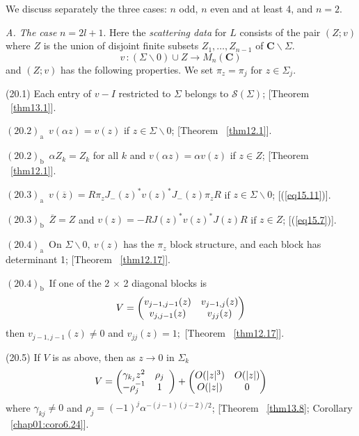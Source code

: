 \documentclass{surv-l}
\theoremstyle{plain}
\theoremstyle{definition}
\numberwithin{equation}{chapter}
\begin{document}
We discuss separately the three cases: $n$ odd, $n$ even and at least 4, and $n=2$.

\emph{A. The case} $n=2l+1$. Here the \emph{scattering data} for $L$ consists of the pair $(Z; v)$ where $Z$ is the union of disjoint finite subsets $Z_{1},\ldots,Z_{n-1}$ of $ \textbf{C}\backslash\Sigma$.
\begin{equation*}
v\,:(\Sigma\backslash 0)\cup Z\rightarrow M_{n}(\mathbf{C})
\end{equation*}
and $(Z;v)$ has the following properties. We set $\pi_{z}=\pi_{j}$ for $z\in\Sigma_{j}$.

(20.1) Each entry of $v - I$ restricted to $\Sigma$ belongs to $\mathscr{S}(\Sigma)$; [Theorem ~\ref{thm13.1}].

$\mathrm{(20.2)}_{\mathrm{a}}$\ $v(\alpha z)=v(z)$ if $z\in\Sigma\backslash 0$; [Theorem ~\ref{thm12.1}].

$\mathrm{(20.2)}_{\mathrm{b}}$\ $\alpha Z_{k}=Z_{k}$ for all $k$ and $v(\alpha z)=\alpha v(z)$ if $z\in Z$; [Theorem ~\ref{thm12.1}].

$\mathrm{(20.3)}_{\mathrm{a}}$\ $v(\overline{z})=R\pi_{z}J_{-} (z)^{*}v(z)^{*}J_{-} (z)\pi_{z}R$ if $z\in\Sigma \backslash 0$; [(\ref{eq15.11})].

$\mathrm{(20.3)}_{\mathrm{b}}$\ $\overline{Z}=Z$ and $v(z)=-RJ(z)^{*}v(z)^{*}J(z)R$ if $z\in Z$; [(\ref{eq15.7})].

$\mathrm{(20.4)}_{\mathrm{a}}$\ On $\Sigma\backslash 0,\ v(z)$ has the $\pi_{z}$ block structure, and each block has determinant 1; [Theorem ~\ref{thm12.17}].

$\mathrm{(20.4)_{b}}$\ If one of the 2 $\times$ 2 diagonal blocks is
\begin{equation*}
V=\left(\begin{array}{@{}cc@{}}
v_{j-1,j-1}(z) & v_{j-1,j}(z)\\
v_{j,j-1}(z) & v_{jj}(z)
\end{array}\right)
\end{equation*}
then $v_{j-1,j-1}(z)\neq 0$ and $v_{j j}(z)=1;$ [Theorem ~\ref{thm12.17}].

(20.5) If $V$ is as above, then as $z\rightarrow 0$ in $\Sigma_{k}$
\begin{equation*}
V=\left(\begin{array}{@{}ccc@{}}
\gamma_{k_{j}}z^{2} & \rho_{j}\\
-\rho_{j}^{-1} &  1
\end{array}\right)  + \left(\begin{array}{@{}cc@{}}
O(|z|^{3}) & O(|z|)\\
O(|z|) & 0
\end{array}\right)
\end{equation*}
where $\gamma_{kj}\neq 0$ and $\rho_{j}=(-1)^{j}\alpha^{-(j-1)(j-2)/2}$; [Theorem ~\ref{thm13.8}; Corollary ~\ref{chap01:coro6.24}].
\end{document}
